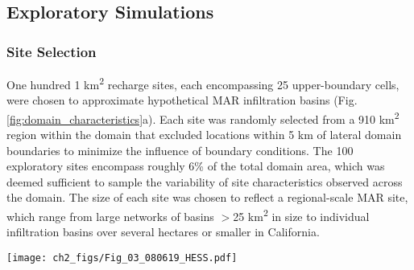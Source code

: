 \subsection{Exploratory Simulations} \label{ssec:MM_exploratory_sims}
\subsubsection{Site Selection} \label{sssec:MM_site_selection}
One hundred 1 km\textsuperscript{2} recharge sites, each encompassing 25 upper-boundary cells, were chosen to approximate hypothetical MAR infiltration basins (Fig. \ref{fig:domain_characteristics}a). Each site was randomly selected from a 910 km\textsuperscript{2} region within the domain that excluded locations within 5 km of lateral domain boundaries to minimize the influence of boundary conditions. The 100 exploratory sites encompass roughly 6\% of the total domain area, which was deemed sufficient to sample the variability of site characteristics observed across the domain. The size of each site was chosen to reflect a regional-scale MAR site, which range from large networks of basins $>$25 km\textsuperscript{2} in size \citep[e.g.,][]{kernFAQ} to individual infiltration basins over several hectares or smaller \citep[e.g.,][]{beganskas2017coupling} in California.

\begin{figure*}[t]
\centering
\texttt{[image: ch2\_figs/Fig\_03\_080619\_HESS.pdf]}
\caption{Plan view of the model domain, where (a) $K\textsubscript{sat}$ of the uppermost model layer (i.e., the surface expression) at all 41,087 x,y cell locations is overlaid with the locations of 100 randomly-sampled 1-km\textsuperscript{2} exploratory recharge sites (red squares) randomly chosen from 910 potential locations. (b) Arithmetic, (c) geometric, and (d) harmonic mean of vertical $K\textsubscript{sat}$ for unsaturated zone (UZ) facies (i.e., $K\textsubscript{geom}$, $K\textsubscript{arith}$, $K\textsubscript{harm}$, respectively) are shown for all x,y cell locations, along with (e) coarse-texture (gravel and sand) fraction of UZ facies ($UZ\textsubscript{coarse}$), (f) simulated initial depth-to-water ($WTD$), and (g) $K\textsubscript{geom}$ multiplied by $WTD$ ($K\textsubscript{geom} \times WTD$).}
\label{fig:domain_characteristics}
\end{figure*}
